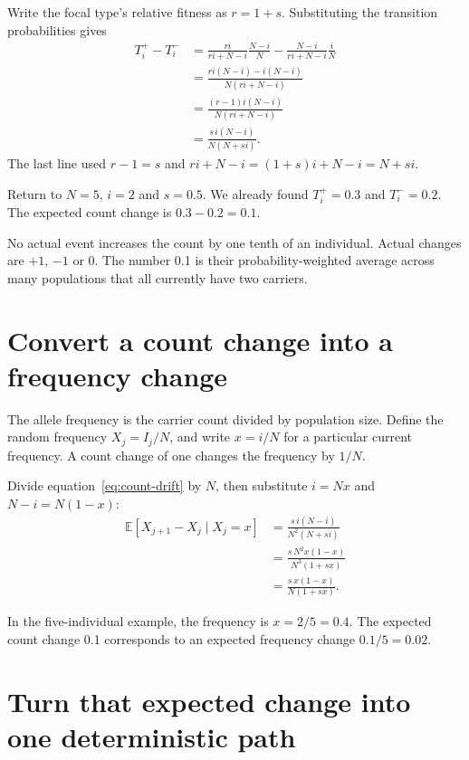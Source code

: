 Write the focal type's relative fitness as $r=1+s$. Substituting the transition probabilities gives
\begin{align}
T_i^+-T_i^-
&=\frac{ri}{ri+N-i}\frac{N-i}{N}
  -\frac{N-i}{ri+N-i}\frac{i}{N}\\
&=\frac{ri(N-i)-i(N-i)}{N(ri+N-i)}\\
&=\frac{(r-1)i(N-i)}{N(ri+N-i)}\\
&=\frac{s\,i(N-i)}{N(N+si)}.
\label{eq:count-drift}
\end{align}
The last line used $r-1=s$ and $ri+N-i=(1+s)i+N-i=N+si$.

\begin{workedexample}
Return to $N=5$, $i=2$ and $s=0.5$. We already found $T_i^+=0.3$ and $T_i^-=0.2$. The expected count change is $0.3-0.2=0.1$.

No actual event increases the count by one tenth of an individual. Actual changes are $+1$, $-1$ or $0$. The number 0.1 is their probability-weighted average across many populations that all currently have two carriers.
\end{workedexample}

\section{Convert a count change into a frequency change}

The allele frequency is the carrier count divided by population size. Define the random frequency $X_j=I_j/N$, and write $x=i/N$ for a particular current frequency. A count change of one changes the frequency by $1/N$.

Divide equation~\eqref{eq:count-drift} by $N$, then substitute $i=Nx$ and $N-i=N(1-x)$:
\begin{align}
\mathbb E[X_{j+1}-X_j\mid X_j=x]
&=\frac{s\,i(N-i)}{N^2(N+si)}\\
&=\frac{s\,N^2x(1-x)}{N^3(1+sx)}\\
&=\frac{s\,x(1-x)}{N(1+sx)}.
\label{eq:frequency-drift}
\end{align}

In the five-individual example, the frequency is $x=2/5=0.4$. The expected count change 0.1 corresponds to an expected frequency change $0.1/5=0.02$.

\section{Turn that expected change into one deterministic path}

